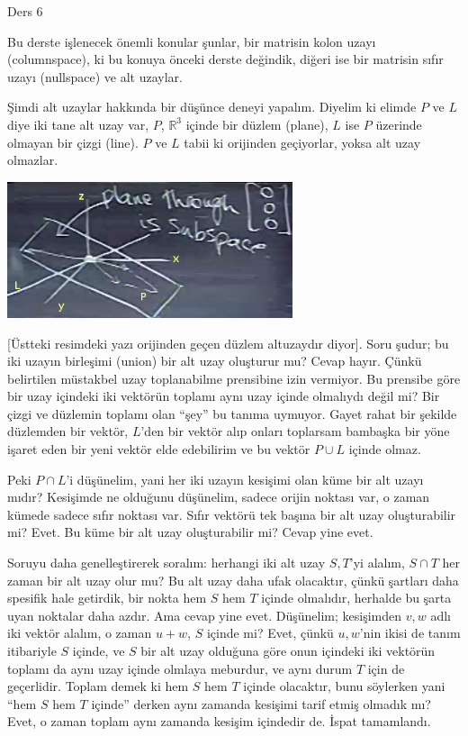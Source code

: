 \documentclass[12pt,fleqn]{article}\usepackage{../../common}
\begin{document}
Ders 6

Bu derste işlenecek önemli konular şunlar, bir matrisin kolon uzayı
(columnspace), ki bu konuya önceki derste değindik, diğeri ise bir
matrisin sıfır uzayı (nullspace) ve alt uzaylar. 

Şimdi alt uzaylar hakkında bir düşünce deneyi yapalım. Diyelim ki elimde $P$
ve $L$ diye iki tane alt uzay var, $P$, $\mathbb{R}^3$ içinde bir düzlem
(plane), $L$ ise $P$ üzerinde olmayan bir çizgi (line). $P$ ve $L$ tabii ki
orijinden geçiyorlar, yoksa alt uzay olmazlar. 

\includegraphics[height=4cm]{6_01.png}

[Üstteki resimdeki yazı orijinden geçen düzlem altuzaydır diyor]. Soru şudur; bu
iki uzayın birleşimi (union) bir alt uzay oluşturur mu?  Cevap hayır. Çünkü
belirtilen müstakbel uzay toplanabilme prensibine izin vermiyor. Bu prensibe
göre bir uzay içindeki iki vektörün toplamı aynı uzay içinde olmalıydı değil mi?
Bir çizgi ve düzlemin toplamı olan ``şey'' bu tanıma uymuyor. Gayet rahat bir
şekilde düzlemden bir vektör, $L$'den bir vektör alıp onları toplarsam bambaşka
bir yöne işaret eden bir yeni vektör elde edebilirim ve bu vektör $P \cup L$
içinde olmaz.

Peki $P \cap L$'i düşünelim, yani her iki uzayın kesişimi olan küme bir
alt uzayı mıdır? Kesişimde ne olduğunu düşünelim, sadece orijin noktası
var, o zaman kümede sadece sıfır noktası var. Sıfır vektörü tek başına bir
alt uzay oluşturabilir mi? Evet. Bu küme bir alt uzay oluşturabilir mi?
Cevap yine evet. 

Soruyu daha genelleştirerek soralım: herhangi iki alt uzay $S,T$'yi alalım,
$S \cap T$ her zaman bir alt uzay olur mu? Bu alt uzay daha ufak olacaktır,
çünkü şartları daha spesifik hale getirdik, bir nokta hem $S$ hem $T$
içinde olmalıdır, herhalde bu şarta uyan noktalar daha azdır. Ama cevap
yine evet. Düşünelim; kesişimden $v,w$ adlı iki vektör alalım, o zaman $u +
w$, $S$ içinde mi? Evet, çünkü $u,w$'nin ikisi de tanım itibariyle $S$
içinde, ve $S$ bir alt uzay olduğuna göre onun içindeki iki vektörün
toplamı da aynı uzay içinde olmlaya meburdur, ve aynı durum $T$ için de
geçerlidir. Toplam demek ki hem $S$ hem $T$ içinde olacaktır, bunu
söylerken yani ``hem $S$ hem $T$ içinde'' derken aynı zamanda kesişimi
tarif etmiş olmadık mı? Evet, o zaman toplam aynı zamanda kesişim içindedir
de. İspat tamamlandı.
\end{document}
